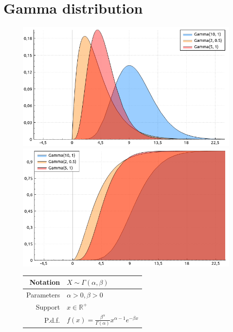 \documentclass[a4paper,11pt]{article}
\theoremstyle{plain}
\theoremstyle{definition}
\newcommand{\MR}{\mathbb{R}}
\begin{document}
		
	\section{Gamma distribution}
	\begin{figure}[!htb]\centering
		\begin{minipage}{0.55\textwidth}
			\includegraphics[width=\linewidth, right]{gamma_pdf}
			\captionsetup{labelformat=empty}
			\includegraphics[width=\linewidth, right]{gamma_cdf}
			\captionsetup{labelformat=empty}
		\end{minipage}
		\begin{minipage}{0.4\textwidth}
			\begin{tabular}{| r | l |}
				\hline
				Notation & $X \sim \Gamma(\alpha, \beta)$ \\
				\hline
				Parameters & $\alpha > 0, \beta > 0$ \\
				\hline
				Support & $x \in \MR^+$  \\
				\hline
				P.d.f. & $f(x) = \frac{\beta^\alpha}{\Gamma(\alpha)} x^{\alpha-1}e^{-\beta x}  $ \\

\end{tabular}
\end{minipage}
\end{figure}
\end{document}
